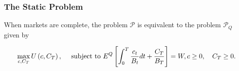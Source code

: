 \documentclass[\topdir/lecture\_notes.tex]{subfiles}
\begin{document}
\subsubsection{The Static Problem}
\begin{proposition}\label{prop:complete_markets_equivalence}
When markets are complete, the problem $\mathcal{P}$ is equivalent to the problem $\mathcal{P}_{Q}$ given by

\begin{equation}
\max _{c, C_{T}} U\left(c, C_{T}\right), \quad \text { subject to } \\
E^{Q}\left[\int_{0}^{T} \frac{c_{t}}{B_{t}} d t+\frac{C_{T}}{B_{T}}\right]=W,  \label{eq:6.5.16}\\
c \geq 0, \quad C_{T} \geq 0 .
\end{equation}
\end{proposition}
\end{document}
